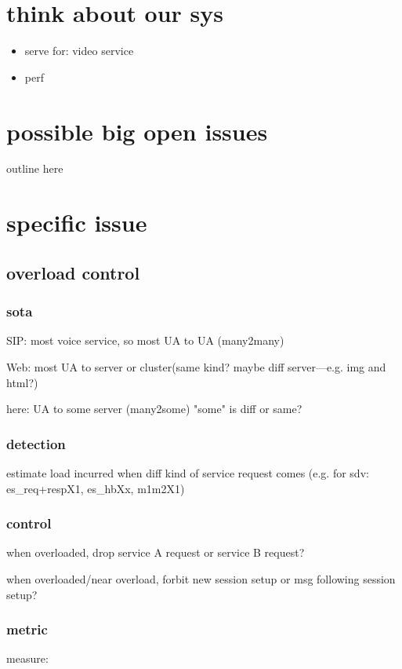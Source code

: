 \documentclass[•]{article}
\begin{document}
\section{think about our sys}
\begin{itemize}
\item serve for: video service
\end{itemize}

\begin{itemize}
\item perf
\subitem 
\end{itemize}


\section{possible big open issues}
outline here

\section{specific issue}

\subsection{overload control}

\subsubsection{sota}
SIP: most voice service, so most UA to UA (many2many)

Web: most UA to server or cluster(same kind? maybe diff server---e.g. img and html?)

here: UA to some server (many2some) "some" is diff or same?

\subsubsection{detection}
estimate load incurred when diff kind of service request comes
(e.g. for sdv: es\_req+respX1, es\_hbXx, m1m2X1)

\subsubsection{control}
when overloaded, drop service A request or service B request?

when overloaded/near overload, forbit new session setup or msg following session setup?

\subsubsection{metric}
measure:\cite{Shen2010}
\end{document}
